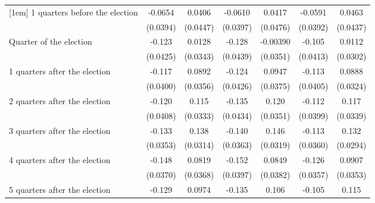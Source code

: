 \begin{table}[htbp]
\begin{tabular}{l*{6}{c}}
[1em]
 1 quarters before the election&     -0.0654         &      0.0406         &     -0.0610         &      0.0417         &     -0.0591         &      0.0463         \\
                    &    (0.0394)         &    (0.0447)         &    (0.0397)         &    (0.0476)         &    (0.0392)         &    (0.0437)         \\
[1em]
Quarter of the election&      -0.123\sym{**} &      0.0128         &      -0.128\sym{**} &    -0.00390         &      -0.105\sym{*}  &      0.0112         \\
                    &    (0.0425)         &    (0.0343)         &    (0.0439)         &    (0.0351)         &    (0.0413)         &    (0.0302)         \\
[1em]
 1 quarters after the election&      -0.117\sym{**} &      0.0892\sym{*}  &      -0.124\sym{**} &      0.0947\sym{*}  &      -0.113\sym{**} &      0.0888\sym{**} \\
                    &    (0.0400)         &    (0.0356)         &    (0.0426)         &    (0.0375)         &    (0.0405)         &    (0.0324)         \\
[1em]
 2 quarters after the election&      -0.120\sym{**} &       0.115\sym{***}&      -0.135\sym{**} &       0.120\sym{***}&      -0.112\sym{**} &       0.117\sym{***}\\
                    &    (0.0408)         &    (0.0333)         &    (0.0434)         &    (0.0351)         &    (0.0399)         &    (0.0339)         \\
[1em]
 3 quarters after the election&      -0.133\sym{***}&       0.138\sym{***}&      -0.140\sym{***}&       0.146\sym{***}&      -0.113\sym{**} &       0.132\sym{***}\\
                    &    (0.0353)         &    (0.0314)         &    (0.0363)         &    (0.0319)         &    (0.0360)         &    (0.0294)         \\
[1em]
 4 quarters after the election&      -0.148\sym{***}&      0.0819\sym{*}  &      -0.152\sym{***}&      0.0849\sym{*}  &      -0.126\sym{***}&      0.0907\sym{*}  \\
                    &    (0.0370)         &    (0.0368)         &    (0.0397)         &    (0.0382)         &    (0.0357)         &    (0.0353)         \\
[1em]
 5 quarters after the election&      -0.129\sym{***}&      0.0974\sym{**} &      -0.135\sym{***}&       0.106\sym{**} &      -0.105\sym{**} &       0.115\sym{***}\\

\end{tabular}
\end{table}

